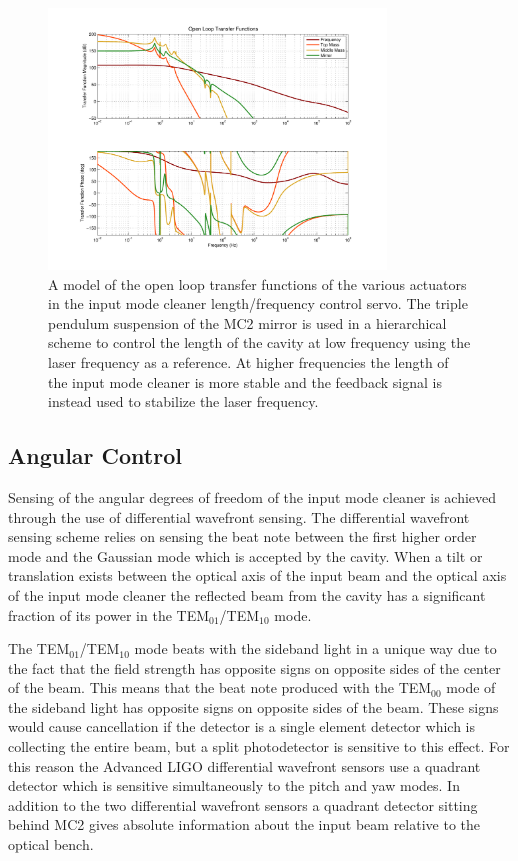\documentclass[10pt]{article}
\begin{document}
\begin{figure}
	\centering
	\includegraphics[width=0.8\textwidth,trim = 2.5cm 2cm 2.5cm 1.5cm]{Open_Loop_Tfs.pdf}
	\caption{A model of the open loop transfer functions of the various actuators in the 
		input mode cleaner length/frequency control servo.  
		The triple pendulum suspension of the MC2 mirror is used in a hierarchical scheme to 
		control the length of the cavity at low frequency using the laser frequency as a reference.  
		At higher frequencies the length of the input mode cleaner is more stable and the feedback 
		signal is instead used to stabilize the laser frequency.}
	\label{fig:ControlLoops}
\end{figure}


\subsection{Angular Control}
Sensing of the angular degrees of freedom of the input mode cleaner is achieved through 
the use of differential wavefront sensing\cite{Anderson1984}\cite{Fritschel1998}.  
The differential wavefront sensing scheme relies on sensing the beat note between 
the first higher order mode and the Gaussian mode which is accepted by the cavity.  
When a tilt or translation exists between the optical axis of the input beam and the optical axis 
of the input mode cleaner the reflected beam from the cavity has a significant fraction of its 
power in the TEM$_{01}$/TEM$_{10}$ mode\cite{Morrison1994}.  

The TEM$_{01}$/TEM$_{10}$ mode beats with the sideband light in a unique way due to the 
fact that the field strength has opposite signs on opposite sides of the center of the beam.  
This means that the beat note produced with the TEM$_{00}$ mode of the sideband light 
has opposite signs on opposite sides of the beam.  
These signs would cause cancellation if the detector is a single element detector which is 
collecting the entire beam, but a split photodetector is sensitive to this effect.  
For this reason the Advanced LIGO differential wavefront sensors use a quadrant detector 
which is sensitive simultaneously to the pitch and yaw modes.
In addition to the two differential wavefront sensors a quadrant detector sitting 
behind MC2 gives absolute information about the input beam relative to the optical bench.
\end{document}
